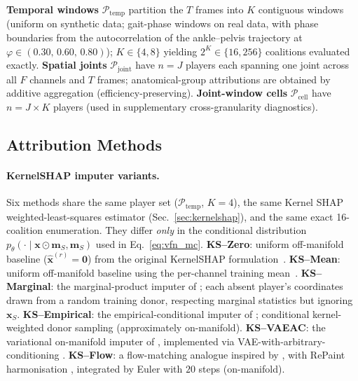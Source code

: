 \textbf{Temporal windows} $\mathcal{P}_{\mathrm{temp}}$ partition the
$T$ frames into $K$ contiguous windows (uniform on synthetic data;
gait-phase windows on real data, with phase boundaries from the
autocorrelation of the ankle--pelvis trajectory at $\varphi
\in (0.30,\,0.60,\,0.80)$); $K{\in}\{4,8\}$ yielding
$2^K{\in}\{16,256\}$ coalitions evaluated exactly.
\textbf{Spatial joints} $\mathcal{P}_{\mathrm{joint}}$ have $n=J$
players each spanning one joint across all $F$ channels and $T$ frames;
anatomical-group attributions are obtained by additive aggregation
(efficiency-preserving).
\textbf{Joint-window cells} $\mathcal{P}_{\mathrm{cell}}$ have
$n = J\times K$ players (used in supplementary cross-granularity
diagnostics).

\subsection{Attribution Methods}
\label{sec:attribution-methods}

\paragraph{KernelSHAP imputer variants.}
Six methods share the same player set ($\mathcal{P}_{\mathrm{temp}}$,
$K{=}4$), the same Kernel SHAP weighted-least-squares estimator
(Sec.~\ref{sec:kernelshap}), and the same exact 16-coalition
enumeration.  They differ \emph{only} in the conditional distribution
$p_\theta(\cdot \mid \mathbf{x}\odot\mathbf{m}_S, \mathbf{m}_S)$ used in
Eq.~\eqref{eq:vfn_mc}.
\textbf{KS--Zero}: uniform off-manifold baseline
($\hat{\mathbf{x}}^{(r)}{=}\mathbf{0}$) from the original KernelSHAP
formulation~\citep{lundberg2017unified}.
\textbf{KS--Mean}: uniform off-manifold baseline using the per-channel
training mean~\citep{lundberg2017unified}.
\textbf{KS--Marginal}: the marginal-product imputer of
\citet{aas2021explaining}; each absent player's coordinates drawn from a
random training donor, respecting marginal statistics but ignoring
$\mathbf{x}_S$.
\textbf{KS--Empirical}: the empirical-conditional imputer of
\citet{aas2021explaining,redelmeier2020explaining}; conditional
kernel-weighted donor sampling (approximately on-manifold).
\textbf{KS--VAEAC}: the variational on-manifold imputer of
\citet{olsen2022using}, implemented via VAE-with-arbitrary-conditioning
\citep{ivanov2018variational}.
\textbf{KS--Flow}: a flow-matching analogue inspired by
\citet{zhang2026axiomatic}, with RePaint harmonisation
\citep{lugmayr2022repaint}, integrated by Euler with $20$ steps
(on-manifold).

